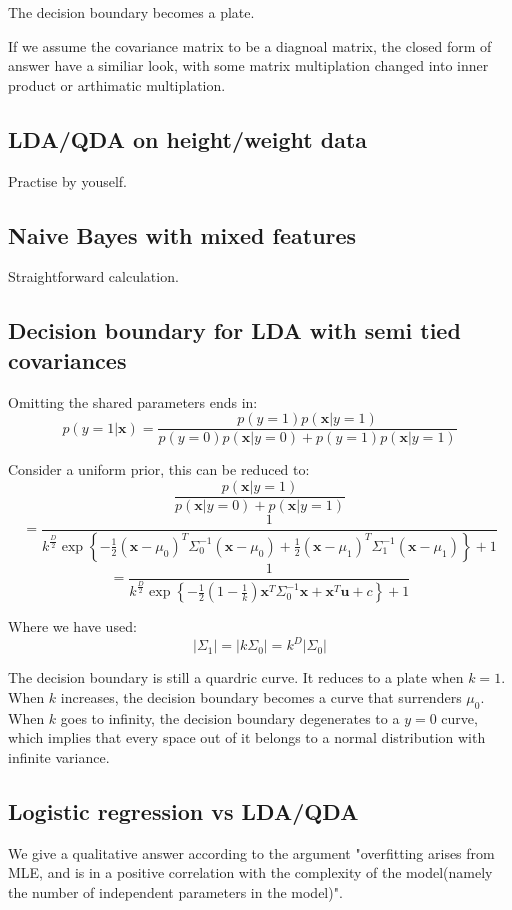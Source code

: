 \documentclass[UTF8]{ctexart}
\begin{document}
The decision boundary becomes a plate.

If we assume the covariance matrix to be a diagnoal matrix, the closed form of answer have a similiar look, with some matrix multiplation changed into inner product or arthimatic multiplation.

\subsection{LDA/QDA on height/weight data}
Practise by youself.

\subsection{Naive Bayes with mixed features}
Straightforward calculation.

\subsection{Decision boundary for LDA with semi tied covariances}
Omitting the shared parameters ends in:
$$p(y=1|\textbf{x}) = \frac{p(y=1)p(\textbf{x}|y=1)}{p(y=0)p(\textbf{x}|y=0)+p(y=1)p(\textbf{x}|y=1)}$$

Consider a uniform prior, this can be reduced to:
$$\frac{p(\textbf{x}|y=1)}{p(\textbf{x}|y=0)+p(\textbf{x}|y=1)}$$
$$=\frac{1}{k^{\frac{D}{2}}\exp\left\{-\frac{1}{2}(\textbf{x}-\mu_{0})^{T}\Sigma_{0}^{-1}(\textbf{x}-\mu_{0}) +\frac{1}{2} (\textbf{x}-\mu_{1})^{T}\Sigma_{1}^{-1}(\textbf{x}-\mu_{1}) \right\}+ 1}$$
$$=\frac{1}{k^{\frac{D}{2}}\exp\left\{ -\frac{1}{2}(1-\frac{1}{k})\textbf{x}^{T}\Sigma_{0}^{-1}\textbf{x}+\textbf{x}^{T}\textbf{u}+c \right\} + 1}$$

Where we have used:
$$|\Sigma_{1}|=|k\Sigma_{0}|=k^{D}|\Sigma_{0}|$$

The decision boundary is still a quardric curve. It reduces to a plate when $k=1$. When $k$ increases, the decision boundary becomes a curve that surrenders $\mu_{0}$. When $k$ goes to infinity, the decision boundary degenerates to a $y=0$ curve, which implies that every space out of it belongs to a normal distribution with infinite variance.

\subsection{Logistic regression vs LDA/QDA}
We give a qualitative answer according to the argument "overfitting arises from MLE, and is in a positive correlation with the complexity of the model(namely the number of independent parameters in the model)".
\end{document}
